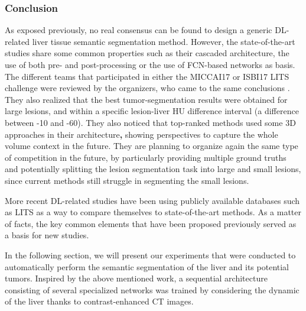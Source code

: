 \subsubsection{Conclusion}

As exposed previously, no real consensus can be found to design a
generic DL-related liver tissue semantic segmentation method. However,
the state-of-the-art studies share some common properties such as their
cascaded architecture, the use of both pre- and post-processing or the
use of FCN-based networks as basis.
The different teams that participated in either the MICCAI17 or ISBI17
LITS challenge were reviewed by the organizers, who came to the same
conclusions \cite{Bilic2019}.
They also realized that the best tumor-segmentation results were
obtained for large lesions, and within a specific lesion-liver HU
difference interval (a difference between -10 and -60).
They also noticed that top-ranked methods used some 3D approaches in
their architecture\textbf{,} showing perspectives to capture the whole
volume context in the future. They are planning to organize again the same
type of competition in the future, by particularly providing multiple
ground truths and potentially splitting the lesion segmentation task
into large and small lesions, since current methods still struggle in
segmenting the small lesions.

More recent DL-related studies have been using publicly available
databases such as LITS as a way to compare themselves to
state-of-the-art methods. As a matter of facts, the key common elements
that have been proposed previously served as a basis for new studies.

In the following section, we will present our experiments that were conducted to automatically perform the semantic segmentation of the liver and its potential tumors. Inspired by the above mentioned work, a sequential architecture consisting of several specialized networks was trained by considering the dynamic of the liver thanks to contrast-enhanced CT images. 


%


